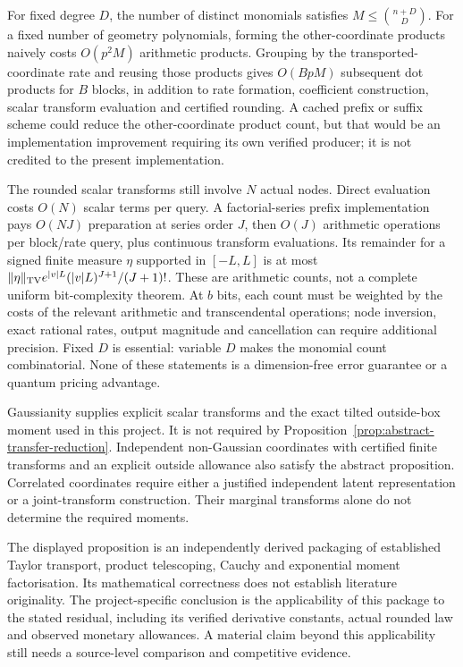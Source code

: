 For fixed degree $D$, the number of distinct monomials satisfies
$M\leq\binom{n+D}{D}$. For a fixed number of geometry polynomials,
forming the other-coordinate products naively costs $O(p^2M)$
arithmetic products. Grouping by the transported-coordinate rate and
reusing those products gives $O(BpM)$ subsequent dot products for $B$
blocks, in addition to rate formation, coefficient construction, scalar
transform evaluation and certified rounding. A cached prefix or suffix
scheme could reduce the other-coordinate product count, but that would
be an implementation improvement requiring its own verified producer;
it is not credited to the present implementation.

The rounded scalar transforms still involve $N$ actual nodes. Direct
evaluation costs $O(N)$ scalar terms per query. A factorial-series
prefix implementation pays $O(NJ)$ preparation at series order $J$,
then $O(J)$ arithmetic operations per block/rate query, plus continuous
transform evaluations. Its remainder for a signed finite measure
$\eta$ supported in $[-L,L]$ is at most
$\|\eta\|_{\rm TV}e^{|v|L}(|v|L)^{J+1}/(J+1)!$.
These are arithmetic counts, not a complete uniform bit-complexity
theorem. At $b$ bits, each count must be weighted by the costs of the
relevant arithmetic and transcendental operations; node inversion,
exact rational rates, output magnitude and cancellation can require
additional precision. Fixed $D$ is essential: variable $D$ makes the
monomial count combinatorial. None of these statements is a
dimension-free error guarantee or a quantum pricing advantage.

Gaussianity supplies explicit scalar transforms and the exact tilted
outside-box moment used in this project. It is not required by
Proposition~\ref{prop:abstract-transfer-reduction}. Independent
non-Gaussian coordinates with certified finite transforms and an
explicit outside allowance also satisfy the abstract proposition.
Correlated coordinates require either a justified independent latent
representation or a joint-transform construction. Their marginal
transforms alone do not determine the required moments.

The displayed proposition is an independently derived packaging of
established Taylor transport, product telescoping, Cauchy and
exponential moment factorisation. Its mathematical correctness does not
establish literature originality. The project-specific conclusion is
the applicability of this package to the stated residual, including its
verified derivative constants, actual rounded law and observed monetary
allowances. A material claim beyond this applicability still needs a
source-level comparison and competitive evidence.
